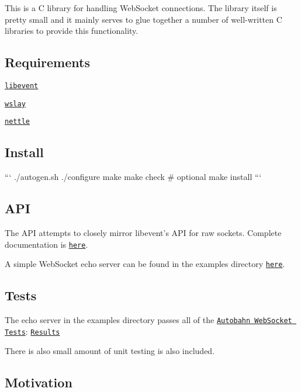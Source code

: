 This is a C library for handling Web\-Socket connections. The library itself is pretty small and it mainly serves to glue together a number of well-\/written C libraries to provide this functionality.

\subsection*{Requirements}


\begin{DoxyItemize}
\item \href{http://libevent.org/}{\tt libevent}
\item \href{http://wslay.sourceforge.net/}{\tt wslay}
\item \href{http://www.lysator.liu.se/~nisse/nettle/}{\tt nettle}
\end{DoxyItemize}

\subsection*{Install}

``` ./autogen.sh ./configure make make check \# optional make install ```

\subsection*{A\-P\-I}

The A\-P\-I attempts to closely mirror libevent's A\-P\-I for raw sockets. Complete documentation is \href{http://crunchyfrog.github.io/libevws/doc/}{\tt here}.

A simple Web\-Socket echo server can be found in the examples directory \href{https://github.com/crunchyfrog/libevws/blob/master/examples/echo_server.c}{\tt here}.

\subsection*{Tests}

The echo server in the examples directory passes all of the \href{http://autobahn.ws/}{\tt Autobahn Web\-Socket Tests}\-: \href{http://crunchyfrog.github.io/libevws/autobahn/}{\tt Results}

There is also small amount of unit testing is also included.

\subsection*{Motivation}

